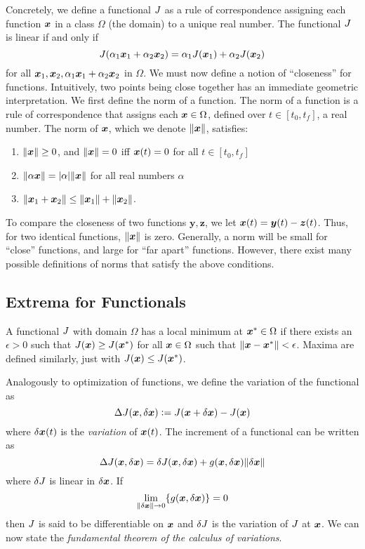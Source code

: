 Concretely, we define a functional $J$ as a rule of correspondence assigning each function $\bm{x}$ in a class $\Omega$ (the domain) to a unique real number. The functional $J$ is linear if and only if 
\begin{equation}
    J(\alpha_1 \bm{x}_1 + \alpha_2 \bm{x}_2) = \alpha_1 J(\bm{x}_1) + \alpha_2 J(\bm{x}_2)
\end{equation}
for all $\bm{x}_1, \bm{x}_2, \alpha_1 \bm{x}_1 + \alpha_2 \bm{x}_2$ in $\Omega$. We must now define a notion of ``closeness'' for functions. Intuitively, two points being close together has an immediate geometric interpretation. We first define the norm of a function. The norm of a function is a rule of correspondence that assigns each $\bm{x} \in \Omega$, defined over $t \in [t_0,t_f]$, a real number. The norm of $\bm{x}$, which we denote $\|\bm{x}\|$, satisfies:
\begin{enumerate}
    \item $\|\bm{x}\| \geq 0$, and $\|\bm{x}\|=0$ iff $\bm{x}(t) = 0$ for all $t \in [t_0,t_f]$
    \item $\|\alpha \bm{x}\| = |\alpha| \|\bm{x}\|$ for all real numbers $\alpha$
    \item $\|\bm{x}_1 + \bm{x}_2\| \leq \|\bm{x}_1\| + \|\bm{x}_2\|$.
\end{enumerate}
To compare the closeness of two functions $\bm{y}, \bm{z}$, we let $\bm{x}(t) = \bm{y}(t) - \bm{z}(t)$. Thus, for two identical functions, $\|\bm{x}\|$ is zero. Generally, a norm will be small for ``close'' functions, and large for ``far apart'' functions. However, there exist many possible definitions of norms that satisfy the above conditions. 

\subsection{Extrema for Functionals}

A functional $J$ with domain $\Omega$ has a local minimum at $\bm{x}^* \in \Omega$ if there exists an $\epsilon > 0$ such that $J(\bm{x}) \geq J(\bm{x}^*)$ for all $\bm{x} \in \Omega$ such that $\|\bm{x} - \bm{x}^*\| < \epsilon$. Maxima are defined similarly, just with $J(\bm{x}) \leq J(\bm{x}^*)$. 

Analogously to optimization of functions, we define the variation of the functional as
\begin{equation}
    \Delta J(\bm{x},\delta \bm{x}) \vcentcolon= J(\bm{x} + \delta \bm{x}) - J(\bm{x})
\end{equation}
where $\delta \bm{x}(t)$ is the \textit{variation} of $\bm{x}(t)$. The increment of a functional can be written as 
\begin{equation}
    \Delta J(\bm{x},\delta \bm{x}) = \delta J(\bm{x},\delta \bm{x}) + g(\bm{x},\delta \bm{x}) \|\delta \bm{x}\|
\end{equation}
where $\delta J$ is linear in $\delta \bm{x}$. If 
\begin{equation}
    \lim_{\|\delta \bm{x} \| \to 0} \{g(\bm{x},\delta \bm{x})\} = 0
\end{equation}
then $J$ is said to be differentiable on $\bm{x}$ and $\delta J$ is the variation of $J$ at $\bm{x}$. 
We can now state the \textit{fundamental theorem of the calculus of variations}. 

